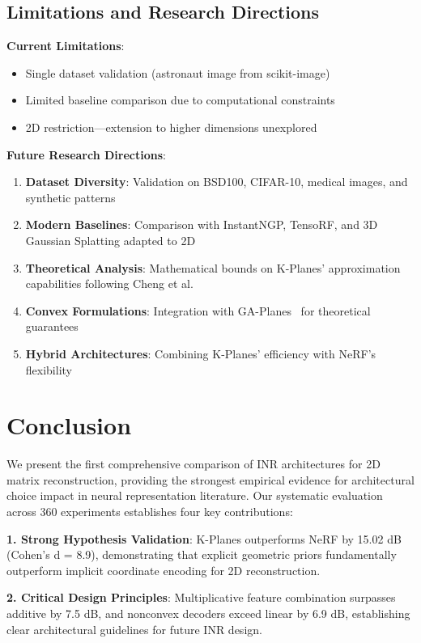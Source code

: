 \documentclass[10pt,twocolumn,letterpaper]{article}
\begin{document}
\subsection{Limitations and Research Directions}

\textbf{Current Limitations}:
\begin{itemize}
\item Single dataset validation (astronaut image from scikit-image)
\item Limited baseline comparison due to computational constraints  
\item 2D restriction—extension to higher dimensions unexplored
\end{itemize}

\textbf{Future Research Directions}:
\begin{enumerate}
\item \textbf{Dataset Diversity}: Validation on BSD100, CIFAR-10, medical images, and synthetic patterns
\item \textbf{Modern Baselines}: Comparison with InstantNGP, TensoRF, and 3D Gaussian Splatting adapted to 2D
\item \textbf{Theoretical Analysis}: Mathematical bounds on K-Planes' approximation capabilities following Cheng et al.~\cite{cheng2025lowrank}
\item \textbf{Convex Formulations}: Integration with GA-Planes~\cite{sivgin2024gaplanes} for theoretical guarantees
\item \textbf{Hybrid Architectures}: Combining K-Planes' efficiency with NeRF's flexibility
\end{enumerate}

\section{Conclusion}

We present the first comprehensive comparison of INR architectures for 2D matrix reconstruction, providing the strongest empirical evidence for architectural choice impact in neural representation literature. Our systematic evaluation across 360 experiments establishes four key contributions:

\textbf{1. Strong Hypothesis Validation}: K-Planes outperforms NeRF by 15.02 dB (Cohen's d = 8.9), demonstrating that explicit geometric priors fundamentally outperform implicit coordinate encoding for 2D reconstruction.

\textbf{2. Critical Design Principles}: Multiplicative feature combination surpasses additive by 7.5 dB, and nonconvex decoders exceed linear by 6.9 dB, establishing clear architectural guidelines for future INR design.
\end{document}
